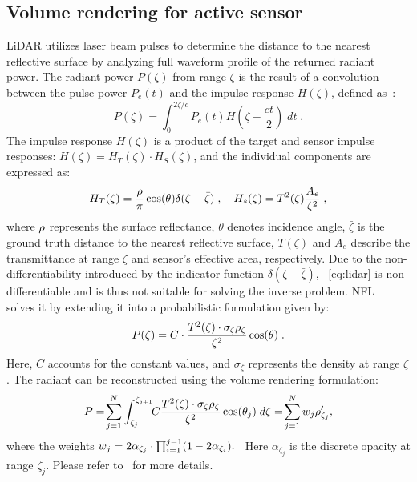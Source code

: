 \subsection{Volume rendering for active sensor} \label{sec:vol_render_background}
LiDAR utilizes laser beam pulses to determine the distance to the nearest reflective surface by analyzing full waveform profile of the returned radiant power. The radiant power $P(\zeta)$ from range $\zeta$ is the result of a convolution between the pulse power $P_e(t)$ and the impulse response $H(\zeta)$, defined as~\cite{hahner2021fog,hahner2022lidar,Huang2023nfl}:
\begin{equation}
    P(\zeta) = \int_0^{2\zeta/c} P_e(t) H(\zeta - \frac{ct}{2}) \; dt\;.
\label{eq:lidar}
\end{equation}
The impulse response $H(\zeta)$ is a product of the target and sensor impulse responses: $H(\zeta) = H_T(\zeta)\cdot H_S(\zeta)$, and the individual components are expressed as:
\begin{equation}
    H_T(\zeta) = \frac{\rho}{\pi} \cos(\theta) \delta(\zeta - \bar{\zeta})\;, \quad  H_s(\zeta) = T^2(\zeta) \frac{A_e}{\zeta^2}\;,
\label{eq:ht}
\end{equation}
where $\rho$ represents the surface reflectance, $\theta$ denotes incidence angle, $\bar{\zeta}$ is the ground truth distance to the nearest reflective surface, $T(\zeta)$ and $A_e$ describe the transmittance at range $\zeta$ and sensor's effective area, respectively. Due to the non-differentiability introduced by the indicator function $\delta(\zeta - \bar{\zeta})$, ~\cref{eq:lidar} is non-differentiable and is thus not suitable for solving the inverse problem. NFL~\cite{Huang2023nfl} solves it by extending it into a probabilistic formulation given by:
\begin{equation}
P(\zeta) = C \cdot \frac{T^2(\zeta) \cdot \sigma_\zeta  \rho_\zeta}{\zeta^2} \cos(\theta)\;.
\label{eq:radiance}
\end{equation}
Here, $C$ accounts for the constant values, and $\sigma_\zeta$ represents the density at range $\zeta$. The radiant can be reconstructed using the volume rendering formulation:
\begin{equation}
      P
      =\!\sum_{j=1}^N \int_{\zeta_j}^{\zeta_{j+1}}\!\!C \frac{T^2({\zeta}) \cdot \sigma_\zeta \rho_\zeta}{\zeta^2} \cos(\theta_j) \; d\zeta
      =\!\sum_{j=1}^N w_j \rho_{\zeta_j}',
\label{eq:radiant_inter}
\end{equation}
where the weights $w_j = 2 \alpha_{\zeta_j} \cdot\prod_{i=1}^{j-1}(1 - 2 \alpha_{\zeta_i}).$
~Here $\alpha_{\zeta_j}$ is the discrete opacity at range $\zeta_j$. Please refer to~\cite{Huang2023nfl} for more details.

